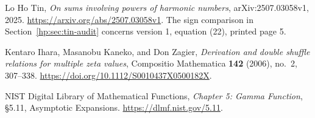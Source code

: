 Lo Ho Tin,
\emph{On sums involving powers of harmonic numbers},
arXiv:2507.03058v1, 2025.
\url{https://arxiv.org/abs/2507.03058v1}.
The sign comparison in Section~\ref{hp:sec:tin-audit} concerns
version 1, equation (22), printed page 5.

Kentaro Ihara, Masanobu Kaneko, and Don Zagier,
\emph{Derivation and double shuffle relations for multiple zeta values},
Compositio Mathematica \textbf{142} (2006), no.~2, 307--338.
\url{https://doi.org/10.1112/S0010437X0500182X}.

NIST Digital Library of Mathematical Functions,
\emph{Chapter 5: Gamma Function}, \S5.11, Asymptotic Expansions.
\url{https://dlmf.nist.gov/5.11}.
